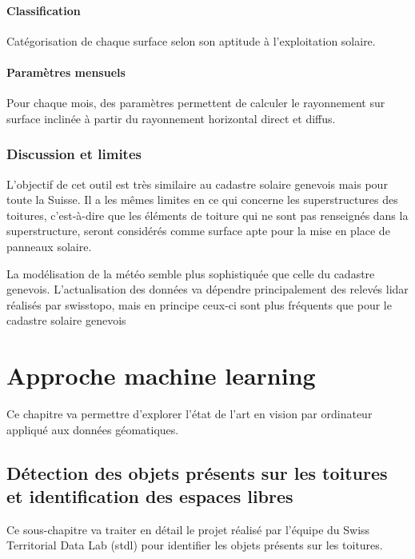 \paragraph{Classification}
\par{Catégorisation de chaque surface selon son aptitude à l'exploitation solaire.}
\paragraph{Paramètres mensuels}
\par{Pour chaque mois, des paramètres permettent de calculer le rayonnement sur surface inclinée à partir du rayonnement horizontal direct et diffus.}
\subsubsection{Discussion et limites}
\par{L'objectif de cet outil est très similaire au cadastre solaire genevois mais pour toute la Suisse. Il a les mêmes limites en ce qui concerne les superstructures des toitures, c'est-à-dire que les éléments de toiture qui ne sont pas renseignés dans la superstructure, seront considérés comme surface apte pour la mise en place de panneaux solaire.}
\par{La modélisation de la météo semble plus sophistiquée que celle du cadastre genevois. L'actualisation des données va dépendre principalement des relevés \gls{lidar} réalisés par swisstopo, mais en principe ceux-ci sont plus fréquents que pour le cadastre solaire genevois}

\section{Approche machine learning}

\par{Ce chapitre va permettre d'explorer l'état de l'art en vision par ordinateur appliqué aux données géomatiques.}

\subsection{Détection des objets présents sur les toitures et identification des espaces libres}
\label{subsec:stdl_analyse}
\vspace{2mm}
\par{Ce sous-chapitre va traiter en détail le projet \cite{herny_detection_2024} réalisé par l'équipe du Swiss Territorial Data Lab (\acrshort{stdl}) pour identifier les objets présents sur les toitures.}

